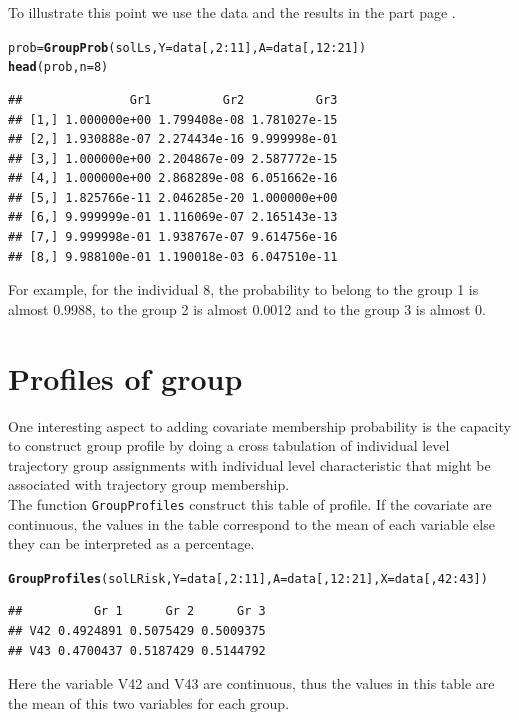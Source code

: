 \documentclass{article}\usepackage[]{graphicx}\usepackage[]{color}
\makeatletter
\newcommand{\hlnum}[1]{\textcolor[rgb]{0.686,0.059,0.569}{#1}}%
\newcommand{\hlopt}[1]{\textcolor[rgb]{0,0,0}{#1}}%
\newcommand{\hlstd}[1]{\textcolor[rgb]{0.345,0.345,0.345}{#1}}%
\newcommand{\hlkwb}[1]{\textcolor[rgb]{0.69,0.353,0.396}{#1}}%
\newcommand{\hlkwc}[1]{\textcolor[rgb]{0.333,0.667,0.333}{#1}}%
\newcommand{\hlkwd}[1]{\textcolor[rgb]{0.737,0.353,0.396}{\textbf{#1}}}%
\newenvironment{kframe}{%
 \def\at@end@of@kframe{}%
 \ifinner\ifhmode%
  \def\at@end@of@kframe{\end{minipage}}%
  \begin{minipage}{\columnwidth}%
 \fi\fi%
 \def\FrameCommand##1{\hskip\@totalleftmargin \hskip-\fboxsep
 \colorbox{shadecolor}{##1}\hskip-\fboxsep
     \hskip-\linewidth \hskip-\@totalleftmargin \hskip\columnwidth}%
 \MakeFramed {\advance\hsize-\width
   \@totalleftmargin\z@ \linewidth\hsize
   \@setminipage}}%
 {\par\unskip\endMakeFramed%
 \at@end@of@kframe}
\newenvironment{knitrout}{}{} %
\makeatother
\begin{document}
To illustrate this point we use the data and the results in the part page \pageref{probCens}.

\begin{knitrout}
\color{fgcolor}\begin{kframe}
\begin{alltt}
\hlstd{prob} \hlkwb{=} \hlkwd{GroupProb}\hlstd{(solLs,} \hlkwc{Y} \hlstd{=  data[,}\hlnum{2}\hlopt{:}\hlnum{11}\hlstd{],} \hlkwc{A} \hlstd{= data[,}\hlnum{12}\hlopt{:}\hlnum{21}\hlstd{])}
\hlkwd{head}\hlstd{(prob,} \hlkwc{n} \hlstd{=} \hlnum{8}\hlstd{)}
\end{alltt}
\begin{verbatim}
##               Gr1          Gr2          Gr3
## [1,] 1.000000e+00 1.799408e-08 1.781027e-15
## [2,] 1.930888e-07 2.274434e-16 9.999998e-01
## [3,] 1.000000e+00 2.204867e-09 2.587772e-15
## [4,] 1.000000e+00 2.868289e-08 6.051662e-16
## [5,] 1.825766e-11 2.046285e-20 1.000000e+00
## [6,] 9.999999e-01 1.116069e-07 2.165143e-13
## [7,] 9.999998e-01 1.938767e-07 9.614756e-16
## [8,] 9.988100e-01 1.190018e-03 6.047510e-11
\end{verbatim}
\end{kframe}
\end{knitrout}
For example, for the individual 8, the probability to belong to the group 1 is almost 0.9988, to the group 2 is almost 0.0012 and to the group 3 is almost 0.

\section{Profiles of group}

One interesting aspect to adding covariate membership probability is the capacity to construct group profile by doing a cross tabulation of individual level trajectory group assignments with individual level characteristic that might be associated with trajectory group membership.\\
The function \verb|GroupProfiles| construct this table of profile. If the covariate are continuous, the values in the table correspond to the mean of each variable else they can be interpreted as a percentage.

\begin{knitrout}
\color{fgcolor}\begin{kframe}
\begin{alltt}
\hlkwd{GroupProfiles}\hlstd{(solLRisk,} \hlkwc{Y} \hlstd{=  data[,}\hlnum{2}\hlopt{:}\hlnum{11}\hlstd{],} \hlkwc{A} \hlstd{= data[,}\hlnum{12}\hlopt{:}\hlnum{21}\hlstd{],} \hlkwc{X} \hlstd{= data[,} \hlnum{42}\hlopt{:}\hlnum{43}\hlstd{])}
\end{alltt}
\begin{verbatim}
##          Gr 1      Gr 2      Gr 3
## V42 0.4924891 0.5075429 0.5009375
## V43 0.4700437 0.5187429 0.5144792
\end{verbatim}
\end{kframe}
\end{knitrout}
Here the variable V42 and V43 are continuous, thus the values in this table are the mean of this two variables for each group. 
\end{document}
